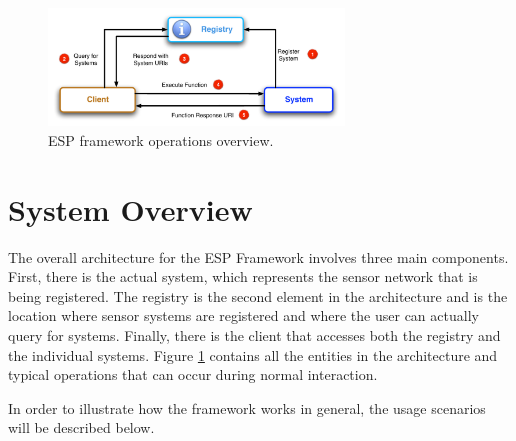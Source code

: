 \begin{figure}
  \centering
  \includegraphics[width=0.70\textwidth]{./images/esp_overview.pdf}
  \caption{ESP framework operations overview.}
  \label{fig:espoverview}
\end{figure}
\section{System Overview}
The overall architecture for the ESP Framework involves three main components. First, there is the actual system, which represents the sensor network that is being registered. 
The registry is the second element in the architecture and is the location where sensor systems are registered and where the user can actually query for systems.  Finally, there is the
client that accesses both the registry and the individual systems. Figure \ref{fig:espoverview} contains all the entities in the architecture and typical operations that can occur during
normal interaction.

In order to illustrate how the framework works in general, the usage scenarios will be described below.  

